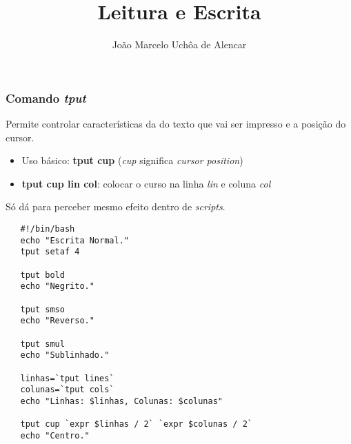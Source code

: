 \documentclass{beamer}
\title{Leitura e Escrita}
\author[João Marcelo Uchôa de Alencar]{João Marcelo Uchôa de Alencar}
\institute{Universidade Federal do Ceará - Quixadá}
\begin{document}
   \begin{frame}
      \titlepage
   \end{frame}

   \begin{frame}
      \frametitle{Comando \textit{tput}}
      Permite controlar características da do texto que vai ser impresso e a posição do cursor. \\
      \begin{itemize}
         \item Uso básico: \textbf{tput cup} (\textit{cup} significa \textit{cursor position})
	      \item \textbf{tput cup lin col}: colocar o curso na linha \textit{lin} e coluna \textit{col}
      \end{itemize}
      Só dá para perceber mesmo efeito dentro de \textit{scripts}.
   \end{frame}

   \begin{frame}[fragile]
   \begin{verbatim}
   #!/bin/bash
   echo "Escrita Normal."
   tput setaf 4

   tput bold
   echo "Negrito."

   tput smso
   echo "Reverso."

   tput smul
   echo "Sublinhado."

   linhas=`tput lines`
   colunas=`tput cols`
   echo "Linhas: $linhas, Colunas: $colunas"

   tput cup `expr $linhas / 2` `expr $colunas / 2`
   echo "Centro."
   \end{verbatim}
\end{frame}

\end{document}
